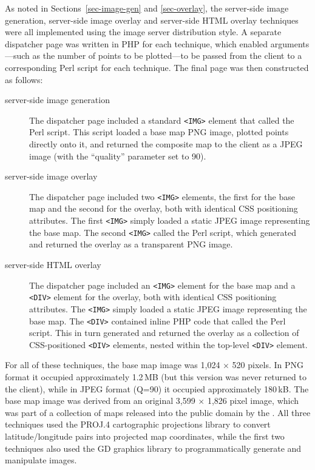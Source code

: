 \documentclass[acmnow]{acmtrans2m}
\begin{document}
As noted in Sections~\ref{sec-image-gen} and \ref{sec-overlay}, the
server-side image generation, server-side image overlay and server-side
HTML overlay techniques were all implemented using the image server
distribution style. A separate dispatcher page was written in PHP for
each technique, which enabled arguments---such as the number of points
to be plotted---to be passed from the client to a corresponding Perl
script for each technique. The final page was then constructed as
follows:
\begin{description}

	\item[server-side image generation] The dispatcher page included a
	standard \verb|<IMG>| element that called the Perl script. This
	script loaded a base map PNG image, plotted points directly onto it,
	and returned the composite map to the client as a JPEG image (with
	the ``quality'' parameter set to 90).

	\item[server-side image overlay] The dispatcher page included two
	\verb|<IMG>| elements, the first for the base map and the second for
	the overlay, both with identical CSS positioning attributes. The
	first \verb|<IMG>| simply loaded a static JPEG image representing
	the base map. The second \verb|<IMG>| called the Perl script, which
	generated and returned the overlay as a transparent PNG image.

	\item[server-side HTML overlay] The dispatcher page included an
	\verb|<IMG>| element for the base map and a \verb|<DIV>| element for
	the overlay, both with identical CSS positioning attributes. The
	\verb|<IMG>| simply loaded a static JPEG image representing the base
	map. The \verb|<DIV>| contained inline PHP code that called the Perl
	script. This in turn generated and returned the overlay as a
	collection of CSS-positioned \verb|<DIV>| elements, nested within
	the top-level \verb|<DIV>| element.

\end{description}

For all of these techniques, the base map image was 1,024 \(\times\) 520
pixels. In PNG format it occupied approximately 1.2\,MB (but this
version was never returned to the client), while in JPEG format (Q=90)
it occupied approximately 180\,kB. The base map image was derived from
an original 3,599 \(\times\) 1,826 pixel image, which was part of a
collection of maps released into the public domain by the
. All three techniques used the PROJ.4 cartographic
projections library to convert latitude/longitude pairs into projected
map coordinates, while the first two techniques also used the GD
graphics library to programmatically generate and manipulate images.
\end{document}
